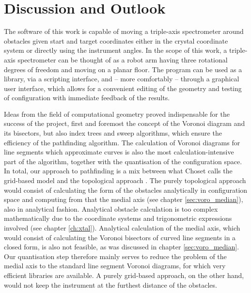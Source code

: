 %
%

\chapter{Discussion and Outlook}
\label{ch:outlook}
The software of this work is capable of moving a triple-axis spectrometer around obstacles 
given start and target coordinates either in the crystal coordinate system or directly using the instrument angles.
In the scope of this work, a triple-axis spectrometer can be thought of as a robot arm having three rotational
degrees of freedom and moving on a planar floor.
The program can be used as a library, via a scripting interface, and -- more comfortably -- through a graphical
user interface, which allows for a convenient editing of the geometry and testing of configuration
with immediate feedback of the results.

Ideas from the field of computational geometry proved indispensable for the success of the project,
first and foremost the concept of the Voronoi diagram and its bisectors, but also index trees and sweep 
algorithms, which ensure the efficiency of the pathfinding algorithm.
The calculation of Voronoi diagrams for line segments which approximate curves is also the most
calculation-intensive part of the algorithm, together with the quantisation of the configuration space.
In total, our approach to pathfinding is a mix between what Choset calls the grid-based model and the
topological approach \cite{Choset2010_ch8}.
The purely topological approach would consist of calculating the form of the obstacles analytically in
configuration space and computing from that the medial axis (see chapter \ref{sec:voro_median}), also
in analytical fashion. 
Analytical obstacle calculation is too complex mathematically due to the coordinate systems and trigonometric
expressions involved (see chapter \ref{ch:xtal}). Analytical calculation of the medial axis, which would consist
of calculating the Voronoi bisectors of curved line segments in a closed form, is also not feasible, 
as was discussed in chapter \ref{sec:voro_median}.
Our quantisation step therefore mainly serves to reduce the problem of the medial axis to the standard
line segment Voronoi diagrams, for which very efficient libraries are available. 
A purely grid-based approach, on the other hand, would not keep the instrument at the furthest distance
of the obstacles.

